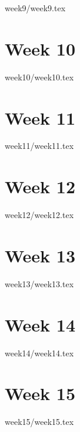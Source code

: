 \documentclass[a4paper]{book}
\begin{document}
{week9/week9.tex}

\chapter{Week 10}

{week10/week10.tex}

\chapter{Week 11}

{week11/week11.tex}

\chapter{Week 12}

{week12/week12.tex}

\chapter{Week 13}

{week13/week13.tex}

\chapter{Week 14}

{week14/week14.tex}

\chapter{Week 15}

{week15/week15.tex}
\end{document}
